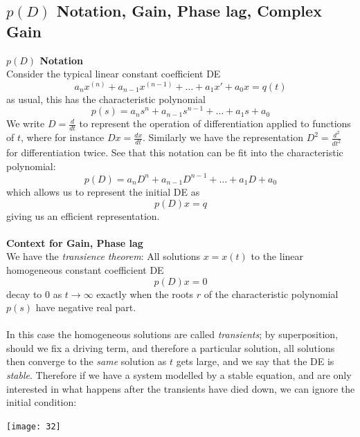 \documentclass{report}
\begin{document}
\subsection{$p(D)$ Notation, Gain, Phase lag, Complex Gain}
\textbf{$p(D)$ Notation}\\
Consider the typical linear constant coefficient DE
\begin{equation*}
a_nx^{(n)}+a_{n-1}x^{(n-1)}+\ldots+a_1x'+a_0x=q(t)
\end{equation*}
as usual, this has the characteristic polynomial
\begin{equation*}
p(s)=a_ns^n+a_{n-1}s^{n-1}+\ldots+a_1s+a_0
\end{equation*}
We write $D=\frac{d}{dt}$ to represent the operation of differentiation applied to functions of $t$, 
where for instance $Dx=\frac{dx}{dt}$. Similarly
we have the representation $D^2=\frac{d^2}{dt^2}$ for differentiation twice. See that this notation can be fit
into the characteristic polynomial:
\begin{equation*}
p(D)=a_nD^n+a_{n-1}D^{n-1}+\ldots+a_1D+a_0
\end{equation*}
which allows us to represent the initial DE as
\begin{equation*}
p(D)x=q
\end{equation*}
giving us an efficient representation.\\
\vspace{1mm}\\
\textbf{Context for Gain, Phase lag}\\
We have the \textit{transience theorem}: All solutions $x=x(t)$ to the linear homogeneous constant coefficient DE
\begin{equation*}
p(D)x=0
\end{equation*}
decay to 0 as $t\to\infty$ exactly when the roots $r$ of the characteristic polynomial $p(s)$ have negative
real part.\\
\vspace{1mm}\\
In this case the homogeneous solutions are called \textit{transients}; by superposition, 
should we fix a driving term, and therefore a particular solution, all solutions then converge to the 
\textit{same} solution as $t$ gets large, and we say that
the DE is \textit{stable}. Therefore if we have a system modelled by a stable equation, and are only interested in
what happens after the transients have died down, we can ignore the initial condition:
\begin{center}
\texttt{[image: 32]}\\
\end{center}
\end{document}
